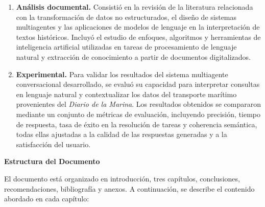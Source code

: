 \begin{enumerate}
	\item \textbf{Análisis documental.} Consistió en la revisión de la literatura relacionada con la transformación de datos no estructurados, el diseño de sistemas multiagentes y las aplicaciones de modelos de lenguaje en la interpretación de textos históricos. Incluyó el estudio de enfoques, algoritmos y herramientas de inteligencia artificial utilizadas en tareas de procesamiento de lenguaje natural y extracción de conocimiento a partir de documentos digitalizados.
	
	\item \textbf{Experimental.} Para validar los resultados del sistema multiagente conversacional desarrollado, se evaluó su capacidad para interpretar consultas en lenguaje natural y contextualizar los datos del transporte marítimo provenientes del \textit{Diario de la Marina}. Los resultados obtenidos se compararon mediante un conjunto de métricas de evaluación, incluyendo precisión, tiempo de respuesta, tasa de éxito en la resolución de tareas y coherencia semántica, todas ellas ajustadas a la calidad de las respuestas generadas y a la satisfacción del usuario.
\end{enumerate}

\textbf{Estructura del Documento}

El documento está organizado en introducción, tres capítulos, conclusiones, recomendaciones, bibliografía y anexos. A continuación, se describe el contenido abordado en cada capítulo:


